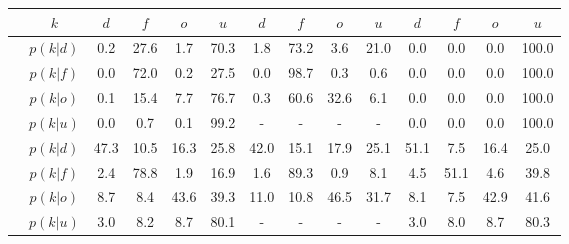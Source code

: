 \begin{figure}[H]
\begin{center}
	\begin{tabular}{c|c|cccc|cccc|cccc}
		&$k$ & $d$ & $f$ & $o$ & $u$ & $d$ & $f$ & $o$ & $u$ & $d$ & $f$ & $o$ & $u$\\
		\hline
		\parbox[t]{2mm}{}&$p(k|d)$ & \textcolor{mygreen}{0.2} & \textcolor{myred}{27.6} & \textcolor{myred}{1.7} & 70.3 & \textcolor{mygreen}{1.8} & \textcolor{myred}{73.2} & \textcolor{myred}{3.6} & 21.0 & \textcolor{mygreen}{0.0} & \textcolor{myred}{0.0} & \textcolor{myred}{0.0} & 100.0\\
		&$p(k|f)$ & \textcolor{myred}{0.0} & \textcolor{mygreen}{72.0} & \textcolor{myred}{0.2} & 27.5 & \textcolor{myred}{0.0} & \textcolor{mygreen}{98.7} & \textcolor{myred}{0.3} & 0.6 & \textcolor{myred}{0.0} & \textcolor{mygreen}{0.0} & \textcolor{myred}{0.0} & 100.0\\
		&$p(k|o)$ & \textcolor{myred}{0.1} & \textcolor{myred}{15.4} & \textcolor{mygreen}{7.7} & 76.7 & \textcolor{myred}{0.3} & \textcolor{myred}{60.6} & \textcolor{mygreen}{32.6} & 6.1 & \textcolor{myred}{0.0} & \textcolor{myred}{0.0} & \textcolor{mygreen}{0.0} & 100.0\\
		&$p(k|u)$ & 0.0 & 0.7 & 0.1 & 99.2 & - & - & - & - & 0.0 & 0.0 & 0.0 & 100.0\\
		\hline
		\parbox[t]{2mm}{}&$p(k|d)$ & \textcolor{mygreen}{47.3} & \textcolor{myred}{10.5} & \textcolor{myred}{16.3} & 25.8 & \textcolor{mygreen}{42.0} & \textcolor{myred}{15.1} & \textcolor{myred}{17.9} & 25.1 & \textcolor{mygreen}{51.1} & \textcolor{myred}{7.5} & \textcolor{myred}{16.4} & 25.0\\
		&$p(k|f)$ & \textcolor{myred}{2.4} & \textcolor{mygreen}{78.8} & \textcolor{myred}{1.9} & 16.9 & \textcolor{myred}{1.6} & \textcolor{mygreen}{89.3} & \textcolor{myred}{0.9} & 8.1 & \textcolor{myred}{4.5} & \textcolor{mygreen}{51.1} & \textcolor{myred}{4.6} & 39.8\\
		&$p(k|o)$ & \textcolor{myred}{8.7} & \textcolor{myred}{8.4} & \textcolor{mygreen}{43.6} & 39.3 & \textcolor{myred}{11.0} & \textcolor{myred}{10.8} & \textcolor{mygreen}{46.5} & 31.7 & \textcolor{myred}{8.1} & \textcolor{myred}{7.5} & \textcolor{mygreen}{42.9} & 41.6\\
		&$p(k|u)$ & 3.0 & 8.2 & 8.7 & 80.1 & - & - & - & - & 3.0 & 8.0 & 8.7 & 80.3\\

\end{tabular}
\end{center}
\end{figure}
